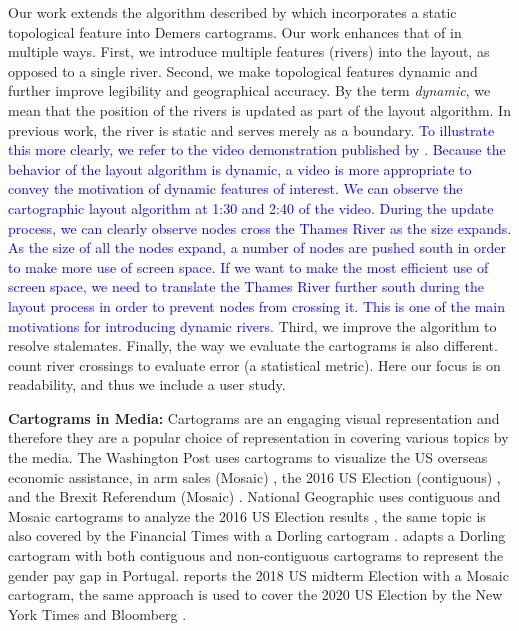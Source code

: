 \documentclass[Afour,sagev,times]{sagej}
\newcommand{\new}[1]{\textcolor{blue}{#1}}
\newcommand{\bobgraph}[1]{\noindent\textbf{#1}}
\begin{document}
Our work extends the algorithm described by \citet{tong2018Cartograms} which incorporates a static topological feature into Demers cartograms.
Our work enhances that of \citet{tong2018Cartograms} in multiple ways.
First, we introduce multiple features (rivers) into the layout, as opposed to a single river.
Second, we make topological features dynamic and further improve legibility and geographical accuracy.
By the term \textit{dynamic}, we mean that the position of the rivers is updated as part of the layout algorithm.
In previous work, the river is static and serves merely as a boundary.
\new{To illustrate this more clearly, we refer to the video demonstration published by \citet{tong2018Cartograms}. Because the behavior of the layout algorithm is dynamic, a video is more appropriate to convey the motivation of dynamic features of interest.
We can observe the cartographic layout algorithm at 1:30 and 2:40 of the video.
During the update process, we can clearly observe nodes cross the Thames River as the size expands.
As the size of all the nodes expand, a number of nodes are pushed south in order to make more use of screen space.
If we want to make the most efficient use of screen space, we need to translate the Thames River further south during the layout process in order to prevent nodes from crossing it.
This is one of the main motivations for introducing dynamic rivers. }
Third, we improve the algorithm to resolve stalemates.
Finally, the way we evaluate the cartograms is also different.
\citet{tong2018Cartograms} count river crossings to evaluate error (a statistical metric).
Here our focus is on readability, and thus we include a user study.

\bobgraph{Cartograms in Media: }Cartograms are an engaging visual representation and therefore they are a popular choice of representation in covering various topics by the media.
The Washington Post uses cartograms to visualize the US overseas economic assistance, in arm sales (Mosaic) \cite{bearak2016Everything}, the 2016 US Election (contiguous) \cite{gamio2016Election}, and the Brexit Referendum (Mosaic) \cite{taylor2016What}.
National Geographic uses contiguous and Mosaic cartograms to analyze the 2016 US Election results \cite{miller2016Election}, the same topic is also covered by the Financial Times with a Dorling cartogram \cite{stabe2016Search}.
\citet{cruz2017Adapted} adapts a Dorling cartogram with both contiguous and non-contiguous cartograms to represent the gender pay gap in Portugal.
\citet{sandberg2018Cartogram} reports the 2018 US midterm Election with a Mosaic cartogram, the same approach is used to cover the 2020 US Election by the New York Times \cite{thelearningnetwork2020What} and Bloomberg \cite{mccartney20202020}.
\end{document}
